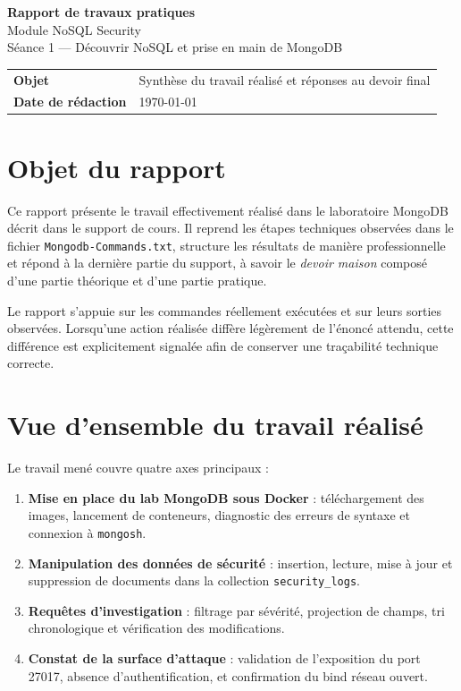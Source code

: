 \documentclass[11pt,a4paper]{article}
\begin{document}
\begin{titlepage}
\centering
\vspace*{2cm}
{\Huge \textbf{Rapport de travaux pratiques}}\\[0.5cm]
{\LARGE Module NoSQL Security}\\[0.4cm]
{\Large Séance 1 --- Découvrir NoSQL et prise en main de MongoDB}\\[1.3cm]

\begin{tabular}{>{\bfseries}p{4.2cm}p{9cm}}
Objet & Synthèse du travail réalisé et réponses au devoir final \\
Date de rédaction & \today
\end{tabular}
\end{titlepage}
\tableofcontents
\newpage


\section{Objet du rapport}

Ce rapport présente le travail effectivement réalisé dans le laboratoire MongoDB décrit dans le support de cours. Il reprend les étapes techniques observées dans le fichier \texttt{Mongodb-Commands.txt}, structure les résultats de manière professionnelle et répond à la dernière partie du support, à savoir le \emph{devoir maison} composé d'une partie théorique et d'une partie pratique.

Le rapport s'appuie sur les commandes réellement exécutées et sur leurs sorties observées. Lorsqu'une action réalisée diffère légèrement de l'énoncé attendu, cette différence est explicitement signalée afin de conserver une traçabilité technique correcte.

\section{Vue d'ensemble du travail réalisé}

Le travail mené couvre quatre axes principaux :

\begin{enumerate}[label=\arabic*)]
  \item \textbf{Mise en place du lab MongoDB sous Docker} : téléchargement des images, lancement de conteneurs, diagnostic des erreurs de syntaxe et connexion à \texttt{mongosh}.
  \item \textbf{Manipulation des données de sécurité} : insertion, lecture, mise à jour et suppression de documents dans la collection \texttt{security\_logs}.
  \item \textbf{Requêtes d'investigation} : filtrage par sévérité, projection de champs, tri chronologique et vérification des modifications.
  \item \textbf{Constat de la surface d'attaque} : validation de l'exposition du port 27017, absence d'authentification, et confirmation du bind réseau ouvert.
\end{enumerate}
\end{document}

